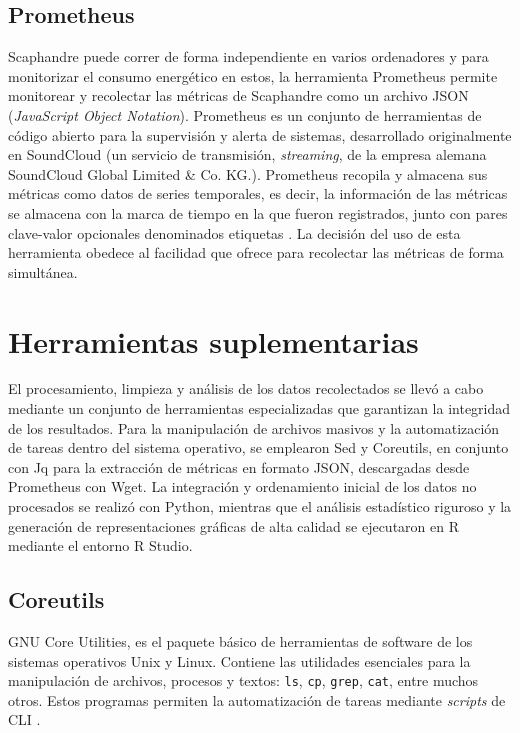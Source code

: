 \documentclass[12pt, letter paper]{report}
\begin{document}
      \subsection{Prometheus} %
      \label{sub:prometheus}
        Scaphandre puede correr de forma independiente en varios ordenadores y
        para monitorizar el consumo energético en estos, la herramienta
        Prometheus permite monitorear y recolectar las métricas de Scaphandre
        como un archivo JSON (\textit{JavaScript Object Notation}). Prometheus
        es un conjunto de herramientas de código abierto para la supervisión y
        alerta de sistemas, desarrollado originalmente en SoundCloud (un
        servicio de transmisión, \textit{streaming}, de la empresa alemana
        SoundCloud Global Limited \& Co. KG.). Prometheus recopila y almacena 
        sus métricas como datos de series temporales, es decir, la información
        de las métricas se almacena con la marca de tiempo en la que fueron
        registrados, junto con pares clave-valor opcionales denominados
        etiquetas \cite{soundcloudoverview2016}. La decisión del uso de esta
        herramienta obedece al facilidad que ofrece para recolectar las
        métricas de forma simultánea.

    \section{Herramientas suplementarias} %
    \label{sec:herramientas_suplementarias}
      El procesamiento, limpieza y análisis de los datos recolectados se llevó a
      cabo mediante un conjunto de herramientas especializadas que garantizan la
      integridad de los resultados. Para la manipulación de archivos masivos y
      la automatización de tareas dentro del sistema operativo, se emplearon Sed
      y Coreutils, en conjunto con Jq para la extracción de métricas en formato
      JSON, descargadas desde Prometheus con Wget. La integración y ordenamiento
      inicial de los datos no procesados se realizó con Python, mientras que el
      análisis estadístico riguroso y la generación de representaciones gráficas
      de alta calidad se ejecutaron en R mediante el entorno R Studio.

      \subsection{Coreutils} %
      \label{sub:coreutils}
        GNU Core Utilities, es el paquete básico de herramientas de software de
        los sistemas operativos Unix y Linux. Contiene las utilidades esenciales
        para la manipulación de archivos, procesos y textos: \texttt{ls},
        \texttt{cp}, \texttt{grep}, \texttt{cat}, entre muchos otros. Estos
        programas permiten la automatización de tareas mediante \textit{scripts}
        de CLI \cite{gnu_coreutils}.
\end{document}

